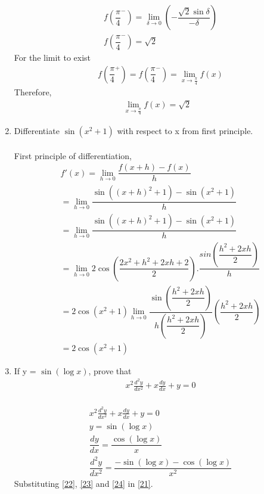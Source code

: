 \documentclass[journal,12pt,twocolumn]{IEEEtran}
\renewcommand\thesection{\arabic{section}}
\begin{document}
\begin{enumerate}[label=\thesection.\arabic*.,ref=\thesection.\theenumi]
\begin{align}
 &f\left(\dfrac{\pi}{4}^-\right) = \lim_{\delta \to0} \left(-\dfrac{\sqrt{2}\sin{\delta}}{-\delta}\right)\\
 &f\left(\dfrac{\pi}{4}^-\right) = \sqrt{2}
 \end{align}
 For the limit to exist
 \begin{align}
 &f\left(\dfrac{\pi}{4}^+\right) = f\left(\dfrac{\pi}{4}^-\right) = \lim_{x\to\frac{\pi}{4}}f(x)
 \end{align}
 Therefore, \begin{align}\lim_{x\to\frac{\pi}{4}}f(x) = \sqrt{2}\end{align}
 \item Differentiate  $ \sin (x^2 + 1) $ with respect to x from first principle.\\
 \solution\\
 First principle of differentiation,
 \begin{align}
 &f'(x) = \lim_{h \to0}\dfrac{f(x+h)-f(x)}{h}\\
 & =  \lim_{h \to0} \dfrac{\sin((x+h)^2+1)-\sin (x^2+1)}{h}\\
 & =  \lim_{h \to0} \dfrac{\sin((x+h)^2+1)-\sin (x^2+1)}{h}\\
 & = \lim_{h \to0} 2\cos \left(\dfrac{2x^2+h^2+2xh+2}{2}\right).\dfrac{sin\left(\dfrac{h^2+2xh}{2}\right)}{h}\\
& = 2\cos \left(x^2 +1\right) \lim_{h \to0} \dfrac{\sin \left(\dfrac{h^2+2xh}{2}\right)}{h\left(\dfrac{h^2+2xh}{2}\right)} \left(\dfrac{h^2+2xh}{2}\right)\\
& = 2\cos \left(x^2 +1\right)
 \end{align}
 \item If y = $\sin(\log x)$, prove that
 \begin{align}
    & x^2\displaystyle\frac{d^2y}{dx^2} + x\displaystyle\frac{dy}{dx} + y = 0 \nonumber
 \end{align}
 \solution \\
 \begin{align}
    & x^2\displaystyle\frac{d^2y}{dx^2} + x\displaystyle\frac{dy}{dx} + y = 0 \label{21} \\
 & y = \sin(\log x)  \label{22}\\
 &\dfrac{dy}{dx} = \dfrac{\cos(\log x)}{x} \label{23}\\
 & \dfrac{d^2y}{dx^2} = \dfrac{-\sin(\log x)-\cos(\log x)}{x^2} \label{24}
 \end{align} 
 Substituting \eqref{22}, \eqref{23} and \eqref{24} in \eqref{21}.
 \begin{align}

\end{align}
\end{enumerate}
\end{document}
